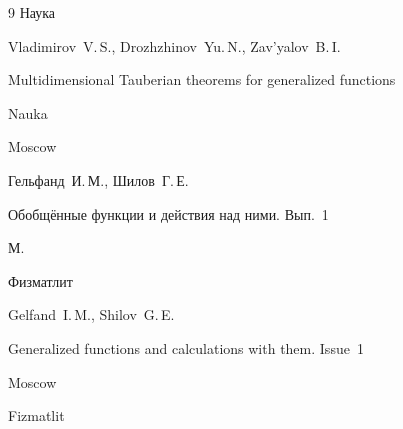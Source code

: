 \begin{thebibliography}{9}
\publ Наука 



\misctransl

\by Vladimirov~V.\,S., Drozhzhinov~Yu.\,N., Zav'yalov~B.\,I. 

\book Multidimensional Tauberian theorems for generalized functions

\publ Nauka

\publaddr Moscow






\by  Гельфанд~И.\,М., Шилов~Г.\,Е.

\book  Обобщённые функции и действия над ними. Вып.~1

\publaddr М. 

\publ Физматлит



\misctransl

\by Gelfand~I.\,M., Shilov~G.\,E.

\book Generalized functions and calculations with them. Issue~1

\publaddr Moscow

\publ Fizmatlit





\end{thebibliography}



\hskip6.5cm \thedate \par

\hskip6.5cm\therevdate\par





\makeengtitlem



\renewcommand{\baselinestretch}{0.9}



\newpage



%

%

